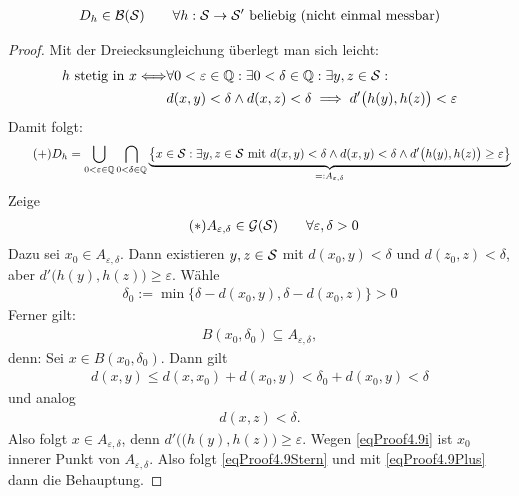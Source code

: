 \begin{lemma}\label{lemma4.9}
	\begin{align*}
		D_h\in\B(\S)\qquad\forall h:\S\to\S'\text{ beliebig (nicht einmal messbar)}
	\end{align*}
\end{lemma}

\begin{proof}
	Mit der Dreiecksungleichung überlegt man sich leicht:
	\begin{align*}
		h\text{ stetig in }x
		\Longleftrightarrow
		&\forall 0<\varepsilon\in\Q:\exists 0<\delta\in\Q:\exists y,z\in\S:\\
		&d(x,y)<\delta\wedge d(x,z)<\delta
		\implies d'\big(h(y),h(z)\big)<\varepsilon
	\end{align*}
	Damit folgt:
	\begin{align}\label{eqProof4.9Plus}\tag{+}
		D_h=\bigcup\limits_{0<\varepsilon\in\Q}\bigcap\limits_{0<\delta\in\Q}\underbrace{\big\lbrace x\in\S:
		\exists y,z\in\S\mit d(x,y)<\delta\wedge d(x,y)<\delta\wedge d'\big(h(y),h(z)\big)\geq\varepsilon\big\rbrace}_{=:A_{\varepsilon,\delta}}
	\end{align}
	Zeige 
	\begin{align}\label{eqProof4.9Stern}\tag{$\ast$}
		A_{\varepsilon,\delta}\in\G(\S)\qquad\forall\varepsilon,\delta>0
	\end{align}
	Dazu sei $x_0\in A_{\varepsilon,\delta}$. 
	Dann existieren $y,z\in\S$ mit $d(x_0,y)<\delta$ und $d(z_0,z)<\delta$, aber $d'\big(h(y),h(z)\big)\geq\varepsilon$. 
	Wähle
	\begin{align*}
		\delta_0:=\min\big\lbrace\delta- d(x_0,y),\delta-d(x_0,z)\big\rbrace>0
	\end{align*}
	Ferner gilt:
	\begin{align}\label{eqProof4.9i}\tag{i}
		B(x_0,\delta_0)\subseteq A_{\varepsilon,\delta},
	\end{align}
	denn: Sei $x\in B(x_0,\delta_0)$. 
	Dann gilt
	\begin{align*}
		d(x,y)\leq d(x,x_0)+d(x_0,y)<\delta_0+d(x_0,y)<\delta
	\end{align*}
	und analog
	\begin{align*}
		d(x,z)<\delta.
	\end{align*}
	Also folgt $x\in A_{\varepsilon,\delta}$, denn $d'\big((h(y),h(z)\big)\geq\varepsilon$. 
	Wegen \eqref{eqProof4.9i} ist $x_0$ innerer Punkt von $A_{\varepsilon,\delta}$. 
	Also folgt \eqref{eqProof4.9Stern} und mit \eqref{eqProof4.9Plus} dann die Behauptung.
\end{proof}

